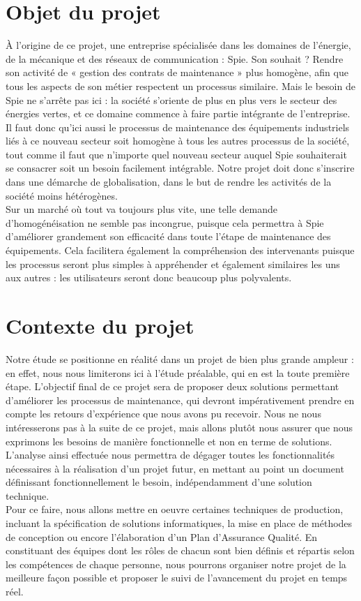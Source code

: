 \section{Objet du projet}

À l'origine de ce projet, une entreprise spécialisée dans les domaines de l'énergie, de la mécanique et des réseaux de communication : Spie. Son souhait ? Rendre son activité de « gestion des contrats de maintenance » plus homogène, afin que tous les aspects de son métier respectent un processus similaire. Mais le besoin de Spie ne s'arrête pas ici : la société s'oriente de plus en plus vers le secteur des énergies vertes, et ce domaine commence à faire partie intégrante de l'entreprise. Il faut donc qu'ici aussi le processus de maintenance des équipements industriels liés à ce nouveau secteur soit homogène à tous les autres processus de la société, tout comme il faut que n'importe quel nouveau secteur auquel Spie souhaiterait se consacrer soit un besoin facilement intégrable. Notre projet doit donc s'inscrire dans une démarche de globalisation, dans le but de rendre les activités de la société moins hétérogènes. \\
    
Sur un marché où tout va toujours plus vite, une telle demande d'homogénéisation ne semble pas incongrue, puisque cela permettra à Spie d'améliorer grandement son efficacité dans toute l'étape de maintenance des équipements. Cela facilitera également la compréhension des intervenants puisque les processus seront plus simples à appréhender et également similaires les uns aux autres : les utilisateurs seront donc beaucoup plus polyvalents.

\section{Contexte du projet}

Notre étude se positionne en réalité dans un projet de bien plus grande ampleur : en effet, nous nous limiterons ici à l'étude préalable, qui en est la toute première étape. L'objectif final de ce projet sera de proposer deux solutions permettant d'améliorer les processus de maintenance, qui devront impérativement prendre en compte les retours d'expérience que nous avons pu recevoir. Nous ne nous intéresserons pas à la suite de ce projet, mais allons plutôt nous assurer que nous exprimons les besoins de manière fonctionnelle et non en terme de solutions. L'analyse ainsi effectuée nous permettra de dégager toutes les fonctionnalités nécessaires à la réalisation d'un projet futur, en mettant au point un document définissant fonctionnellement le besoin, indépendamment d'une solution technique. \\
    
Pour ce faire, nous allons mettre en oeuvre certaines techniques de production, incluant la spécification de solutions informatiques, la mise en place de méthodes de conception ou encore l’élaboration d’un Plan d’Assurance Qualité. En constituant des équipes dont les rôles de chacun sont bien définis et répartis selon les compétences de chaque personne, nous pourrons organiser notre projet de la meilleure façon possible et proposer le suivi de l’avancement du projet en temps réel.

